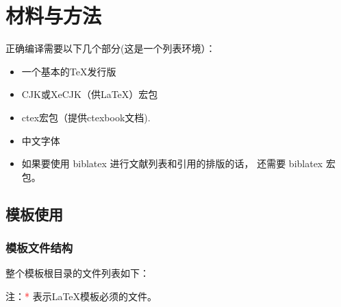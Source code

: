 \chapter{材料与方法}

正确编译需要以下几个部分(这是一个列表环境）：
\begin{itemize}
    \item 一个基本的\TeX{}发行版
    \item CJK或XeCJK（供\LaTeX{}）宏包
    \item ctex宏包（提供ctexbook文档).
    \item 中文字体
    \item 如果要使用 biblatex 进行文献列表和引用的排版的话， 还需要 biblatex 宏包。
\end{itemize}

\section{模板使用}
\subsection{模板文件结构\label{sec:files}}
整个模板根目录的文件列表如下：
\begin{center}
    \begin{table}[htbp]
    \end{table}
\end{center}
注：\textcolor{red}{{*}} 表示\LaTeX{}模板必须的文件。


